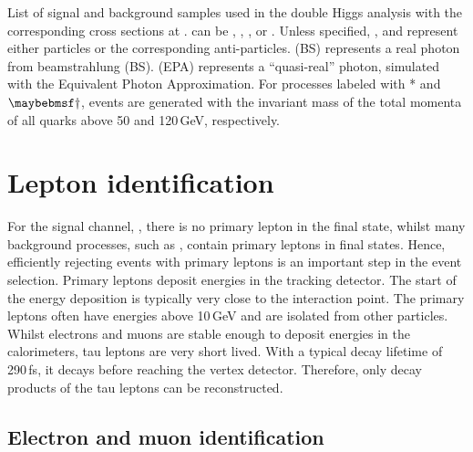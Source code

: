 \begin{table}[!tbp]
\caption[Signal and background samples with the corresponding cross sections at .]
{List of signal and background samples used in the double Higgs analysis with the corresponding cross sections at . \Pquark can be \Pup, \Pdown, \Pstrange, \Pbottom or \Ptop. Unless specified, \Pquark, \Plepton and \Pnu represent either particles or the corresponding anti-particles. \Pphoton(BS) represents a real photon from beamstrahlung (BS). \Pphoton(EPA) represents a ``quasi-real'' photon, simulated with the Equivalent Photon Approximation. For processes labeled with * and $\myDagger$, events are generated with the invariant mass of the total momenta of all quarks above 50 and 120\,GeV, respectively.}
\label{tab:doubleHiggsMCSamples}
\end{table}

\section{Lepton identification}
\label{sec:doubleHiggsLepton}

For the signal channel, \eeToHHbbWWHad, there is no primary lepton in the final state, whilst many background  processes, such as \HepProcess{\Pquark \Pquark \Pquark \Pquark \Plepton \Pnu}, contain primary leptons in final states. Hence, efficiently rejecting events with primary leptons is an important step in the event selection. Primary leptons deposit energies in the tracking detector. The start of the energy deposition is typically very close to the interaction point. The primary leptons often have energies above 10\,GeV and are  isolated from other particles. Whilst electrons and muons are stable enough to deposit energies in the calorimeters, tau leptons are very short lived. With a typical decay lifetime of 290\,fs\cite{Agashe:2014kda}, it decays before reaching the vertex detector. Therefore, only decay products of the tau leptons can be reconstructed.





\subsection{Electron and muon identification}
\label{sec:doubleHiggsLeptonID}

